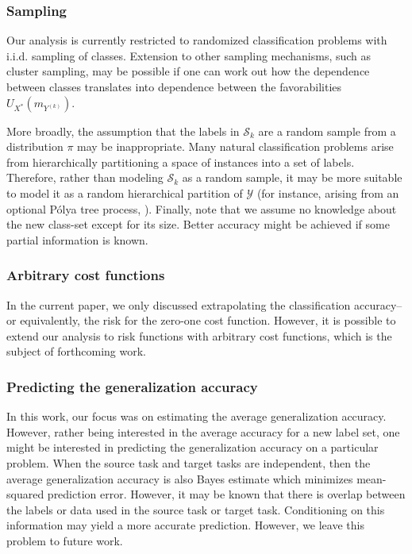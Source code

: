 \documentclass[twoside,11pt]{article}
\begin{document}
\subsubsection*{Sampling}
Our analysis is currently restricted to
randomized classification problems with i.i.d. sampling of classes.
Extension to other sampling mechanisms, such as cluster sampling, may
be possible if one can work out how the dependence between classes
translates into dependence between the favorabilities
$U_{X^*}(m_{Y^{(k)}})$. 

More broadly, the assumption that the labels in $\mathcal{S}_k$ are a
random sample from a distribution $\pi$ may be inappropriate.  Many
natural classification problems arise from hierarchically partitioning
a space of instances into a set of labels.  Therefore, rather than
modeling $\mathcal{S}_k$ as a random sample, it may be more suitable
to model it as a random hierarchical partition of $\mathcal{Y}$ (for
instance, arising from an optional P{\'o}lya tree process,
\cite{wong2010optional}).
Finally, note that we assume no knowledge about the new class-set
except for its size. Better accuracy might be achieved if some partial information 
is known.

\subsubsection*{Arbitrary cost functions}

In the current paper, we only discussed extrapolating the
classification accuracy--or equivalently, the risk for the zero-one
cost function.  However, it is possible to extend our analysis to risk
functions with arbitrary cost functions, which is the subject of
forthcoming work.

\subsubsection*{Predicting the generalization accuracy}
In this work, our focus was on estimating the average generalization accuracy.  However, rather being interested in the average accuracy for a new label set, one might be interested in predicting the generalization accuracy on a particular problem.  When the source task and target tasks are independent, then the average generalization accuracy is also Bayes estimate which minimizes mean-squared prediction error.  However, it may be known that there is overlap between the labels or data used in the source task or target task.  Conditioning on this information may yield a more accurate prediction.  However, we leave this problem to future work.
\end{document}
